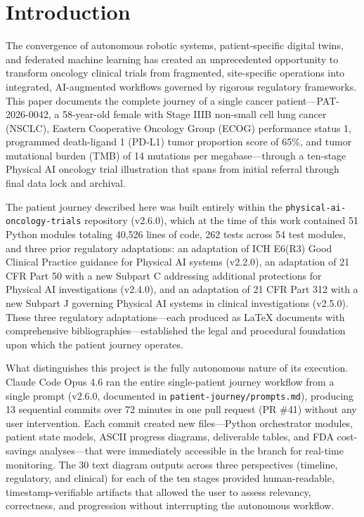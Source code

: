 \documentclass{article}
\begin{document}
\section{Introduction}
\label{sec:introduction}

\vspace{-0.2cm}

The convergence of autonomous robotic systems, patient-specific digital twins, and federated machine learning has created an unprecedented opportunity to transform oncology clinical trials from fragmented, site-specific operations into integrated, AI-augmented workflows governed by rigorous regulatory frameworks. This paper documents the complete journey of a single cancer patient---PAT-2026-0042, a 58-year-old female with Stage IIIB non-small cell lung cancer (NSCLC), Eastern Cooperative Oncology Group (ECOG) performance status 1, programmed death-ligand 1 (PD-L1) tumor proportion score of 65\%, and tumor mutational burden (TMB) of 14 mutations per megabase---through a ten-stage Physical AI oncology trial illustration that spans from initial referral through final data lock and archival.

\vspace{-0.1cm}

The patient journey described here was built entirely within the \texttt{physical-ai-oncology-trials} repository (v2.6.0), which at the time of this work contained 51 Python modules totaling 40,526 lines of code, 262 tests across 54 test modules, and three prior regulatory adaptations: an adaptation of ICH E6(R3) Good Clinical Practice guidance for Physical AI systems (v2.2.0), an adaptation of 21 CFR Part 50 with a new Subpart C addressing additional protections for Physical AI investigations (v2.4.0), and an adaptation of 21 CFR Part 312 with a new Subpart J governing Physical AI systems in clinical investigations (v2.5.0). These three regulatory adaptations---each produced as LaTeX documents with comprehensive bibliographies---established the legal and procedural foundation upon which the patient journey operates.

What distinguishes this project is the fully autonomous nature of its execution. Claude Code Opus 4.6 ran the entire single-patient journey workflow from a single prompt (v2.6.0, documented in \texttt{patient-journey/prompts.md}), producing 13 sequential commits over 72 minutes in one pull request (PR \#41) without any user intervention. Each commit created new files---Python orchestrator modules, patient state models, ASCII progress diagrams, deliverable tables, and FDA cost-savings analyses---that were immediately accessible in the branch for real-time monitoring. The 30 text diagram outputs across three perspectives (timeline, regulatory, and clinical) for each of the ten stages provided human-readable, timestamp-verifiable artifacts that allowed the user to assess relevancy, correctness, and progression without interrupting the autonomous workflow.
\end{document}
